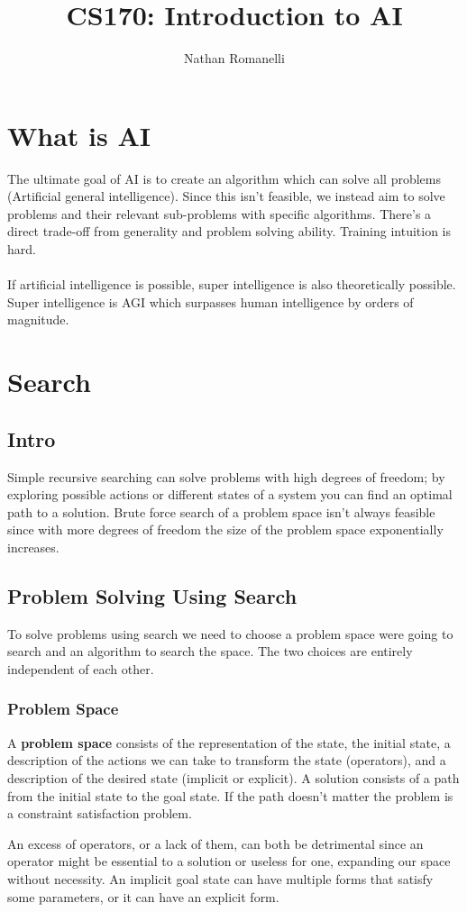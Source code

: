 \documentclass{chezarticle}
\title{CS170: Introduction to AI}
\author{Nathan Romanelli}
\date{}
\begin{document}
\maketitle
\newpage
\tableofcontents

\section{What is AI}
The ultimate goal of AI is to create an algorithm which can solve all problems (Artificial general intelligence). Since this isn't feasible, we instead aim to solve problems and their relevant sub-problems with specific algorithms. There's a direct trade-off from generality and problem solving ability. Training intuition is hard.
\\
\\
If artificial intelligence is possible, super intelligence is also theoretically possible. Super intelligence is AGI which surpasses human intelligence by orders of magnitude. 
\section{Search}
\subsection{Intro}
Simple recursive searching can solve problems with high degrees of freedom; by exploring possible actions or different states of a system you can find an optimal path to a solution. Brute force search of a problem space isn't always feasible since with more degrees of freedom the size of the problem space exponentially increases.
\subsection{Problem Solving Using Search}
To solve problems using search we need to choose a problem space were going to search and an algorithm to search the space. The two choices are entirely independent of each other. 
\subsubsection{Problem Space}
\begin{definition}
A \textbf{problem space} consists of the representation of the state, the initial state, a description of the actions we can take to transform the state (operators), and a description of the desired state (implicit or explicit). A solution consists of a path from the initial state to the goal state. If the path doesn't matter the problem is a constraint satisfaction problem.
\end{definition}
An excess of operators, or a lack of them, can both be detrimental since an operator might be essential to a solution or useless for one, expanding our space without necessity. An implicit goal state can have multiple forms that satisfy some parameters, or it can have an explicit form.
\end{document}
